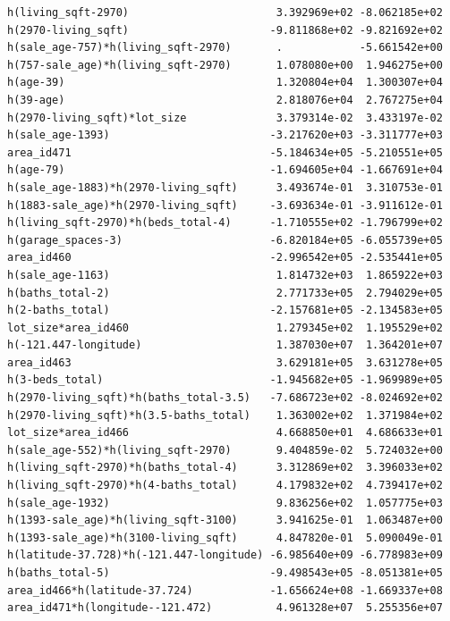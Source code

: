 \documentclass[
]{article}
\begin{document}
\begin{verbatim}
h(living_sqft-2970)                       3.392969e+02 -8.062185e+02
h(2970-living_sqft)                      -9.811868e+02 -9.821692e+02
h(sale_age-757)*h(living_sqft-2970)       .            -5.661542e+00
h(757-sale_age)*h(living_sqft-2970)       1.078080e+00  1.946275e+00
h(age-39)                                 1.320804e+04  1.300307e+04
h(39-age)                                 2.818076e+04  2.767275e+04
h(2970-living_sqft)*lot_size              3.379314e-02  3.433197e-02
h(sale_age-1393)                         -3.217620e+03 -3.311777e+03
area_id471                               -5.184634e+05 -5.210551e+05
h(age-79)                                -1.694605e+04 -1.667691e+04
h(sale_age-1883)*h(2970-living_sqft)      3.493674e-01  3.310753e-01
h(1883-sale_age)*h(2970-living_sqft)     -3.693634e-01 -3.911612e-01
h(living_sqft-2970)*h(beds_total-4)      -1.710555e+02 -1.796799e+02
h(garage_spaces-3)                       -6.820184e+05 -6.055739e+05
area_id460                               -2.996542e+05 -2.535441e+05
h(sale_age-1163)                          1.814732e+03  1.865922e+03
h(baths_total-2)                          2.771733e+05  2.794029e+05
h(2-baths_total)                         -2.157681e+05 -2.134583e+05
lot_size*area_id460                       1.279345e+02  1.195529e+02
h(-121.447-longitude)                     1.387030e+07  1.364201e+07
area_id463                                3.629181e+05  3.631278e+05
h(3-beds_total)                          -1.945682e+05 -1.969989e+05
h(2970-living_sqft)*h(baths_total-3.5)   -7.686723e+02 -8.024692e+02
h(2970-living_sqft)*h(3.5-baths_total)    1.363002e+02  1.371984e+02
lot_size*area_id466                       4.668850e+01  4.686633e+01
h(sale_age-552)*h(living_sqft-2970)       9.404859e-02  5.724032e+00
h(living_sqft-2970)*h(baths_total-4)      3.312869e+02  3.396033e+02
h(living_sqft-2970)*h(4-baths_total)      4.179832e+02  4.739417e+02
h(sale_age-1932)                          9.836256e+02  1.057775e+03
h(1393-sale_age)*h(living_sqft-3100)      3.941625e-01  1.063487e+00
h(1393-sale_age)*h(3100-living_sqft)      4.847820e-01  5.090049e-01
h(latitude-37.728)*h(-121.447-longitude) -6.985640e+09 -6.778983e+09
h(baths_total-5)                         -9.498543e+05 -8.051381e+05
area_id466*h(latitude-37.724)            -1.656624e+08 -1.669337e+08
area_id471*h(longitude--121.472)          4.961328e+07  5.255356e+07
                                                                    

\end{verbatim}
\end{document}
